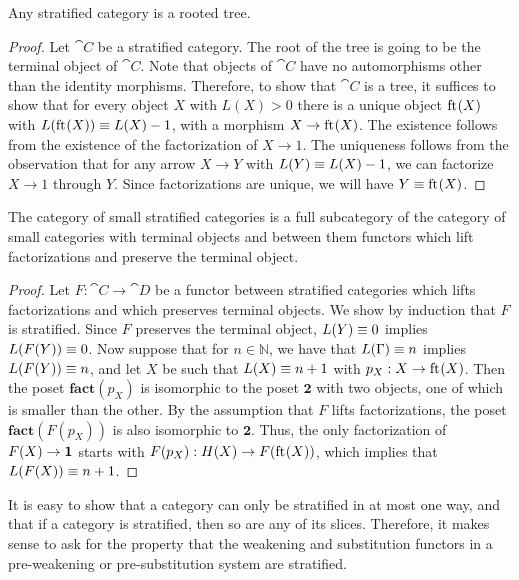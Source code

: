\begin{lem}
Any stratified category is a rooted tree.
\end{lem}

\begin{proof}
Let $\cat{C}$ be a stratified category. The root of the tree is going to be the terminal
object of $\cat{C}$. Note that objects of $\cat{C}$ have no automorphisms other
than the identity morphisms. Therefore, to show that $\cat{C}$ is a tree,
it suffices to show that for every object $X$ with $L(X)>0$ there is
a unique object $\mathrm{ft}_{}(X)$ with $L(\mathrm{ft}_{}(X))\equiv L(X)-1$, with a morphism $X\to \mathrm{ft}_{}(X)$.
The existence follows from the existence of the factorization of $X\to 1$. The 
uniqueness follows from the observation that for any arrow
$X\to Y$ with $L(Y)\equiv L(X)-1$, we can factorize $X\to 1$ through $Y$. Since
factorizations are unique, we will have $Y\equiv \mathrm{ft}_{}(X)$. 
\end{proof}

\begin{lem}
The category of small stratified categories is a full subcategory of the category
of small categories with terminal objects and between them functors which lift 
factorizations and preserve the terminal object.
\end{lem}

\begin{proof}
Let $F:\cat{C}\to\cat{D}$ be a functor between stratified categories which lifts
factorizations and 
which preserves terminal objects. We show by induction that $F$ is stratified.
Since $F$ preserves the terminal object, $L(Y)\equiv 0$ implies $L(F(Y))\equiv 0$.
Now suppose that for $n\in\mathbb{N}$, we have that $L(\Gamma)\equiv n$ implies
$L(F(Y))\equiv n$, and let $X$ be such that $L(X)\equiv n+1$ with
$p_X:X\to\mathrm{ft}_{}(X)$. Then the poset $\mathbf{fact}(p_X)$ is isomorphic to the
poset $\mathbf{2}$ with two objects, one of which is smaller than the other. By the
assumption that $F$ lifts factorizations, the poset $\mathbf{fact}(F(p_X))$
is also isomorphic to $\mathbf{2}$. Thus, the only factorization
of $F(X)\to\mathbf{1}$ starts with $F(p_X):H(X)\to F(\mathrm{ft}_{}(X))$, which implies that
$L(F(X))\equiv n+1$. 
\end{proof}

\begin{rmk}
It is easy to show that a category can only be stratified in at most one way,
and that if a category is stratified, then so are any of its slices. Therefore,
it makes sense to ask for the property that the weakening and substitution
functors in a pre-weakening or pre-substitution system are stratified.
\end{rmk}

